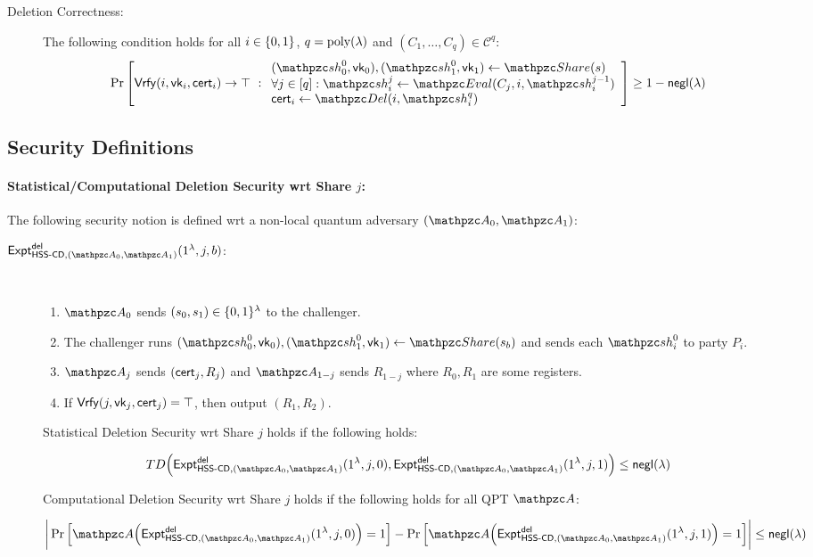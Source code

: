 \begin{description}
\item [Deletion Correctness:] The following condition holds for
all $i \in \{0,1\}$, $q = {\mathrm{poly}}(\lambda)$ and $(C_1, \ldots, C_q) \in
\mathcal{C}^q:$
\begin{align}
\Pr\left[
\Vrfy(i, \vk_i, \cert_i) \rightarrow \top
\ :
\begin{array}{ll}
(\qsh_0^0, \vk_0), (\qsh_1^0, \vk_1) \gets \Sh(s)\\
\forall j \in [q]: \qsh_i^j \leftarrow \Ev(C_j, i,
\qsh_i^{j-1})\\
\cert_i \leftarrow \Del(i, \qsh_i^q)
\end{array}
\right] \geq 1 - \negl(\secp)
\end{align}
\end{description}



\subsection{Security Definitions}
\paragraph{Statistical/Computational Deletion Security wrt Share $j$:}
The following security notion is defined wrt a non-local quantum
adversary $(\qA_0, \qA_1)$:

\begin{description}
\item [$\expa{\HSScd, (\qA_0, \qA_1)}{del}(1^\secp, j, b)$:] $ $
\begin{enumerate}
\item $\qA_0$ sends $(s_0, s_1) \in \{0,1\}^\lambda$ to the challenger.
\item 
The challenger runs
$(\qsh_0^0, \vk_0), (\qsh_1^0, \vk_1) \gets \Sh(s_b)$ and sends each
$\qsh_i^0$ to party $P_i$.

\item $\qA_j$ sends $(\mathsf{cert}_j, R_j)$ and $\qA_{1-j}$ sends $R_{1-j}$
where $R_0, R_1$ are some registers.
\item If $\mathsf{Vrfy}(j, \mathsf{vk}_j, \mathsf{cert}_j) = \top$, then output $(R_1, R_2)$.
\end{enumerate}

Statistical Deletion Security wrt Share $j$ holds if the following
holds:

$$TD\Big(\expa{\HSScd, (\qA_0, \qA_1)}{del}(1^\secp, j,
0), \expa{\HSScd, (\qA_0, \qA_1)}{del}(1^\secp, j,
1)\Big) \le \negl(\secp)$$

Computational Deletion Security wrt Share $j$ holds if the following
holds for all QPT $\qA$:

$$\bigg\lvert \Pr\Big[\qA\Big(\expa{\HSScd, (\qA_0,
\qA_1)}{del}(1^\secp, j, 0)\Big)=1\Big] -
\Pr\Big[\qA\Big(\expa{\HSScd, (\qA_0,
\qA_1)}{del}(1^\secp, j, 1)\Big)=1\Big]
\bigg\rvert \le \negl(\secp)$$

\end{description}

